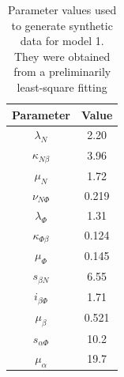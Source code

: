 
\begin{table}[H]
    \centering
    \begin{tabular}{|c c|}
        \hline
        Parameter            & Value \\[0.5ex]
        \hline\hline
        $\lambda_N$          & 2.20  \\
        $\kappa_{N\beta}$    & 3.96  \\
        $\mu_N$              & 1.72  \\
        $\nu_{N\Phi}$        & 0.219 \\
        \hline
        $\lambda_\Phi$       & 1.31  \\
        $\kappa_{\Phi\beta}$ & 0.124 \\
        $\mu_\Phi$           & 0.145 \\
        \hline
        $s_{\beta N}$        & 6.55  \\
        $i_{\beta\Phi}$      & 1.71  \\
        $\mu_\beta$          & 0.521 \\
        \hline
        $s_{\alpha\Phi}$     & 10.2  \\
        $\mu_\alpha$         & 19.7  \\
        \hline
    \end{tabular}
    \caption[Parameter values used to generate synthetic data for model 1]
    {Parameter values used to generate synthetic data for model 1. They were obtained from a preliminarily least-square fitting}
    \label{table:known_values}
\end{table}


